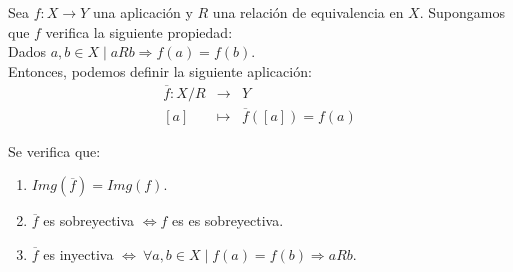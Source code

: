 \begin{prop}
    Sea $f:X \rightarrow Y$ una aplicación y $R$ una relación de equivalencia en $X$. Supongamos que $f$ verifica la siguiente propiedad:\\
    
    Dados $a,b \in X \mid aRb \Rightarrow f(a) = f(b)$.\\
    
    Entonces, podemos definir la siguiente aplicación:
    \begin{equation*}
        \begin{array}{rll}
            \overline{f}: X/R & \longrightarrow & Y\\
                \left[ a \right] & \longmapsto & \overline{f}([a])=f(a)
        \end{array}
    \end{equation*}
    
    Se verifica que:
    \begin{enumerate}
        \item $Img(\overline{f}) = Img(f)$.
        \item $\overline{f}$ es sobreyectiva $\Longleftrightarrow f$ es es sobreyectiva.
        \item $\overline{f}$ es inyectiva $\Longleftrightarrow~\forall a,b \in X \mid f(a) = f(b) \Rightarrow aRb$.
    \end{enumerate}
\end{prop}
